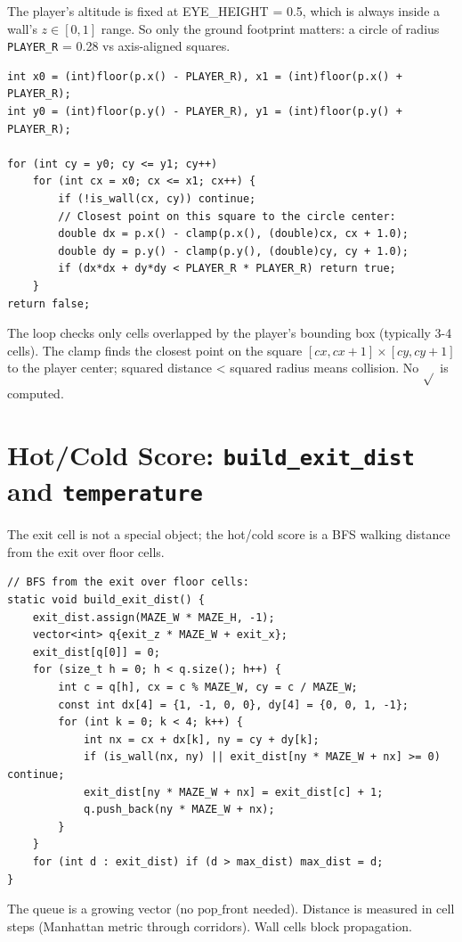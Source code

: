 The player's altitude is fixed at EYE\_HEIGHT = 0.5, which is always inside a wall's $z \in [0, 1]$ range. So only the ground footprint matters: a circle of radius \texttt{PLAYER\_R} = 0.28 vs axis-aligned squares.
\begin{verbatim}
int x0 = (int)floor(p.x() - PLAYER_R), x1 = (int)floor(p.x() + PLAYER_R);
int y0 = (int)floor(p.y() - PLAYER_R), y1 = (int)floor(p.y() + PLAYER_R);

for (int cy = y0; cy <= y1; cy++)
    for (int cx = x0; cx <= x1; cx++) {
        if (!is_wall(cx, cy)) continue;
        // Closest point on this square to the circle center:
        double dx = p.x() - clamp(p.x(), (double)cx, cx + 1.0);
        double dy = p.y() - clamp(p.y(), (double)cy, cy + 1.0);
        if (dx*dx + dy*dy < PLAYER_R * PLAYER_R) return true;
    }
return false;
\end{verbatim}
The loop checks only cells overlapped by the player's bounding box (typically 3-4 cells). The clamp finds the closest point on the square $[cx, cx+1] \times [cy, cy+1]$ to the player center; squared distance < squared radius means collision. No $\sqrt{}$ is computed.

\section{Hot/Cold Score: \texttt{build\_exit\_dist} and \texttt{temperature}}

The exit cell is not a special object; the hot/cold score is a BFS walking distance from the exit over floor cells.
\begin{verbatim}
// BFS from the exit over floor cells:
static void build_exit_dist() {
    exit_dist.assign(MAZE_W * MAZE_H, -1);
    vector<int> q{exit_z * MAZE_W + exit_x};
    exit_dist[q[0]] = 0;
    for (size_t h = 0; h < q.size(); h++) {
        int c = q[h], cx = c % MAZE_W, cy = c / MAZE_W;
        const int dx[4] = {1, -1, 0, 0}, dy[4] = {0, 0, 1, -1};
        for (int k = 0; k < 4; k++) {
            int nx = cx + dx[k], ny = cy + dy[k];
            if (is_wall(nx, ny) || exit_dist[ny * MAZE_W + nx] >= 0) continue;
            exit_dist[ny * MAZE_W + nx] = exit_dist[c] + 1;
            q.push_back(ny * MAZE_W + nx);
        }
    }
    for (int d : exit_dist) if (d > max_dist) max_dist = d;
}
\end{verbatim}
The queue is a growing vector (no $\text{pop\_front}$ needed). Distance is measured in cell steps (Manhattan metric through corridors). Wall cells block propagation.

